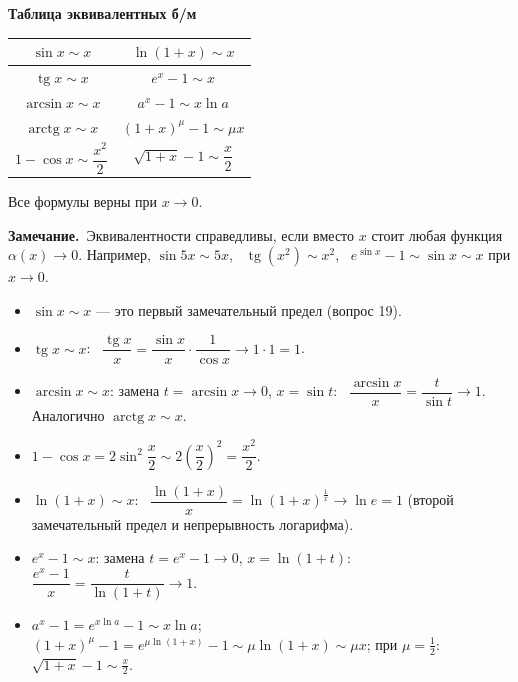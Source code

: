 \documentclass[a4paper,11pt]{article}
\DeclareMathOperator{\tg}{tg}
\DeclareMathOperator{\arctg}{arctg}
\newcommand{\zam}{\par\smallskip\noindent\textbf{\textcolor{zamc}{Замечание.}}\ }
\newcommand{\podr}[1]{\par\needspace{8\baselineskip}\medskip
  {\large\bfseries\textcolor{oprc!80!black}{#1}}\par\nopagebreak\smallskip}
\begin{document}
\podr{Таблица эквивалентных б/м}

\begin{center}
\renewcommand{\arraystretch}{1.7}
\begin{tabular}{|c|c|}
  \hline
  $\sin x \sim x$ & $\ln(1 + x) \sim x$ \\ \hline
  $\tg x \sim x$ & $e^x - 1 \sim x$ \\ \hline
  $\arcsin x \sim x$ & $a^x - 1 \sim x \ln a$ \\ \hline
  $\arctg x \sim x$ & $(1 + x)^\mu - 1 \sim \mu x$ \\ \hline
  $1 - \cos x \sim \dfrac{x^2}{2}$ & $\sqrt{1 + x} - 1 \sim \dfrac{x}{2}$ \\ \hline
\end{tabular}
\end{center}
Все формулы верны при \textbf{$x \to 0$}.

\zam Эквивалентности справедливы, если вместо $x$ стоит любая функция $\alpha(x) \to 0$. Например,
$\sin 5x \sim 5x$, \ $\tg(x^2) \sim x^2$, \ $e^{\sin x} - 1 \sim \sin x \sim x$ при $x \to 0$.

\begin{dop}
\begin{itemize}
  \item $\sin x \sim x$ --- это первый замечательный предел (вопрос 19).
  \item $\tg x \sim x$: \ $\dfrac{\tg x}{x} = \dfrac{\sin x}{x} \cdot \dfrac{1}{\cos x} \to 1 \cdot 1 = 1$.
  \item $\arcsin x \sim x$: замена $t = \arcsin x \to 0$, $x = \sin t$: \ $\dfrac{\arcsin x}{x} = \dfrac{t}{\sin t} \to 1$. Аналогично $\arctg x \sim x$.
  \item $1 - \cos x = 2\sin^2\dfrac{x}{2} \sim 2\left(\dfrac{x}{2}\right)^2 = \dfrac{x^2}{2}$.
  \item $\ln(1 + x) \sim x$: \ $\dfrac{\ln(1 + x)}{x} = \ln (1 + x)^{\frac1x} \to \ln e = 1$ (второй замечательный предел и непрерывность логарифма).
  \item $e^x - 1 \sim x$: замена $t = e^x - 1 \to 0$, $x = \ln(1 + t)$: \ $\dfrac{e^x - 1}{x} = \dfrac{t}{\ln(1 + t)} \to 1$.
  \item $a^x - 1 = e^{x \ln a} - 1 \sim x \ln a$; \quad $(1 + x)^\mu - 1 = e^{\mu \ln(1 + x)} - 1 \sim \mu \ln(1 + x) \sim \mu x$;
        \quad при $\mu = \frac12$: $\sqrt{1 + x} - 1 \sim \frac{x}{2}$.
\end{itemize}
\end{dop}
\end{document}
